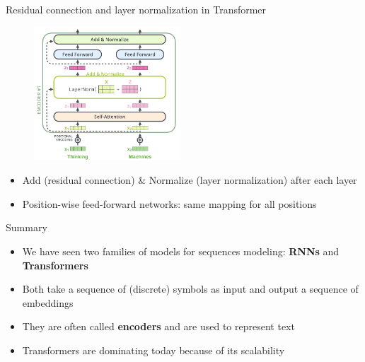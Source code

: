 \documentclass[usenames,dvipsnames,notes,11pt,aspectratio=169,hyperref={colorlinks=true, linkcolor=blue}]{beamer}
\begin{document}
\begin{frame}
    {Residual connection and layer normalization in Transformer}
    \begin{figure}
        \includegraphics[height=5cm]{figures/add-norm}
    \end{figure}
    \vspace{-2em}
    \begin{itemize}
        \item Add (residual connection) \& Normalize (layer normalization) after each layer
        \item Position-wise feed-forward networks: same mapping for all positions
    \end{itemize}
\end{frame}

\begin{frame}
    {Summary}
    \begin{itemize}
        \item We have seen two families of models for sequences modeling: \textbf{RNNs} and \textbf{Transformers}
        \item Both take a sequence of (discrete) symbols as input and output a sequence of embeddings
        \item They are often called \textbf{encoders} and are used to represent text
        \item Transformers are dominating today because of its scalability
    \end{itemize}
\end{frame}
\end{document}
